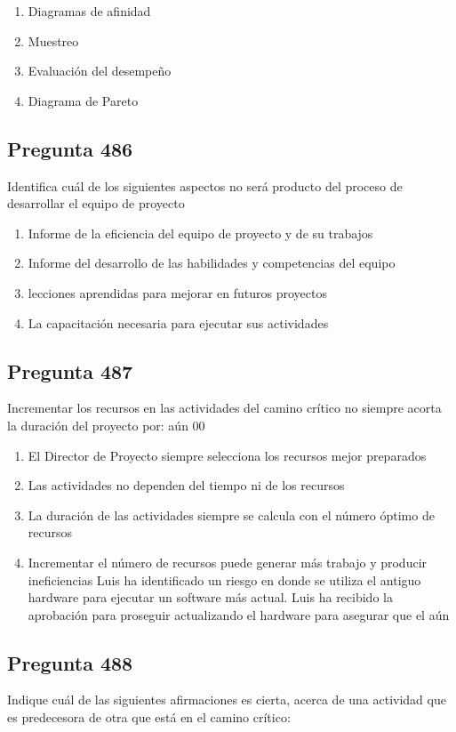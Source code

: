 \documentclass[11pt,a4paper]{article}
\begin{document}
\begin{enumerate}[label=\alph*)]
  \item Diagramas de afinidad
  \item Muestreo
  \item Evaluación del desempeño
  \item Diagrama de Pareto
\end{enumerate}

\subsection*{Pregunta 486}
Identifica cuál de los siguientes aspectos no será producto del proceso de desarrollar el equipo de proyecto

\begin{enumerate}[label=\alph*)]
  \item Informe de la eficiencia del equipo de proyecto y de su trabajos
  \item Informe del desarrollo de las habilidades y competencias del equipo
  \item lecciones aprendidas para mejorar en futuros proyectos
  \item La capacitación necesaria para ejecutar sus actividades
\end{enumerate}

\subsection*{Pregunta 487}
Incrementar los recursos en las actividades del camino crítico no siempre acorta la duración del proyecto por: aún 00

\begin{enumerate}[label=\alph*)]
  \item El Director de Proyecto siempre selecciona los recursos mejor preparados
  \item Las actividades no dependen del tiempo ni de los recursos
  \item La duración de las actividades siempre se calcula con el número óptimo de recursos
  \item Incrementar el número de recursos puede generar más trabajo y producir ineficiencias Luis ha identificado un riesgo en donde se utiliza el antiguo hardware para ejecutar un software más actual. Luis ha recibido la aprobación para proseguir actualizando el hardware para asegurar que el aún
\end{enumerate}

\subsection*{Pregunta 488}
Indique cuál de las siguientes afirmaciones es cierta, acerca de una actividad que es predecesora de otra que está en el camino crítico:
\end{document}
